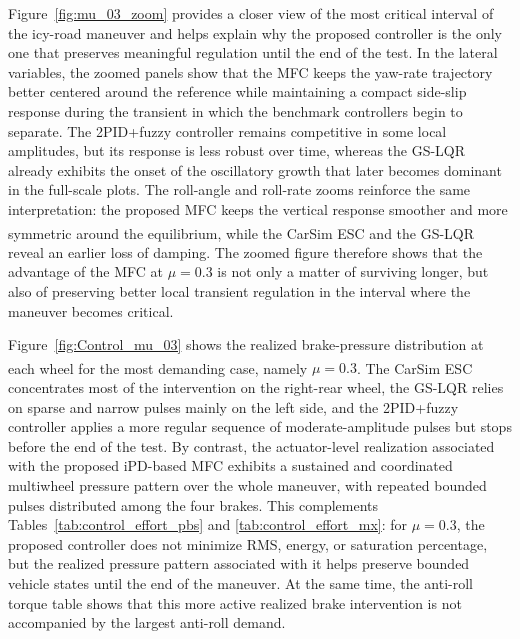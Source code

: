 \documentclass[sn-chicago,iicol]{sn-jnl}
\theoremstyle{thmstyleone}%
\theoremstyle{thmstyletwo}%
\theoremstyle{thmstylethree}%
\begin{document}
Figure~\ref{fig:mu_03_zoom} provides a closer view of the most critical interval of the icy-road maneuver and helps explain why the proposed controller is the only one that preserves meaningful regulation until the end of the test. In the lateral variables, the zoomed panels show that the MFC keeps the yaw-rate trajectory better centered around the reference while maintaining a compact side-slip response during the transient in which the benchmark controllers begin to separate. The 2PID+fuzzy controller remains competitive in some local amplitudes, but its response is less robust over time, whereas the GS-LQR already exhibits the onset of the oscillatory growth that later becomes dominant in the full-scale plots. The roll-angle and roll-rate zooms reinforce the same interpretation: the proposed MFC keeps the vertical response smoother and more symmetric around the equilibrium, while the CarSim\textsuperscript{\textregistered} ESC and the GS-LQR reveal an earlier loss of damping. The zoomed figure therefore shows that the advantage of the MFC at $\mu = 0.3$ is not only a matter of surviving longer, but also of preserving better local transient regulation in the interval where the maneuver becomes critical.


Figure~\ref{fig:Control_mu_03} shows the realized brake-pressure distribution at each wheel for the most demanding case, namely $\mu = 0.3$. The CarSim\textsuperscript{\textregistered} ESC concentrates most of the intervention on the right-rear wheel, the GS-LQR relies on sparse and narrow pulses mainly on the left side, and the 2PID+fuzzy controller applies a more regular sequence of moderate-amplitude pulses but stops before the end of the test. By contrast, the actuator-level realization associated with the proposed iPD-based MFC exhibits a sustained and coordinated multiwheel pressure pattern over the whole maneuver, with repeated bounded pulses distributed among the four brakes. This complements Tables~\ref{tab:control_effort_pbs} and \ref{tab:control_effort_mx}: for $\mu = 0.3$, the proposed controller does not minimize RMS, energy, or saturation percentage, but the realized pressure pattern associated with it helps preserve bounded vehicle states until the end of the maneuver. At the same time, the anti-roll torque table shows that this more active realized brake intervention is not accompanied by the largest anti-roll demand.
\end{document}
